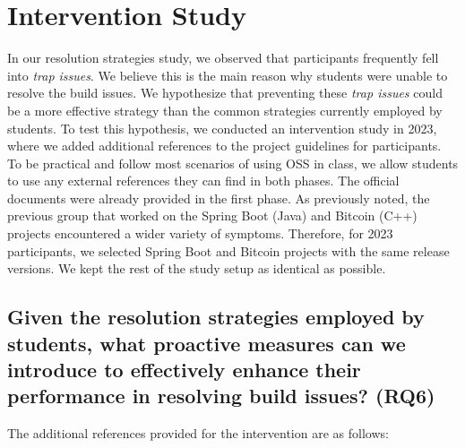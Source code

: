 \documentclass[10pt, conference]{IEEEtran}
\begin{document}
\section{Intervention Study}
\label{sec:results23}
In our resolution strategies study, we observed that participants frequently fell into \textit{trap issues}. We believe this is the main reason why students were unable to resolve the build issues. We hypothesize that preventing these \textit{trap issues} could be a more effective strategy than the common strategies currently employed by students. To test this hypothesis, we conducted an intervention study in 2023, where we added additional references to the project guidelines for participants. To be practical and follow most scenarios of using OSS in class, we allow students to use any external references they can find in both phases. The official documents were already provided in the first phase. As previously noted, the previous group that worked on the Spring Boot (Java) and Bitcoin (C++) projects encountered a wider variety of symptoms. Therefore, for 2023 participants, we selected Spring Boot and Bitcoin projects with the same release versions. We kept the rest of the study setup as identical as possible.

\subsection{Given the resolution strategies employed by students, what proactive measures can we introduce to effectively enhance their performance in resolving build issues? (RQ6)}
\label{sec:RQ6}
The additional references provided for the intervention are as follows:
\end{document}
